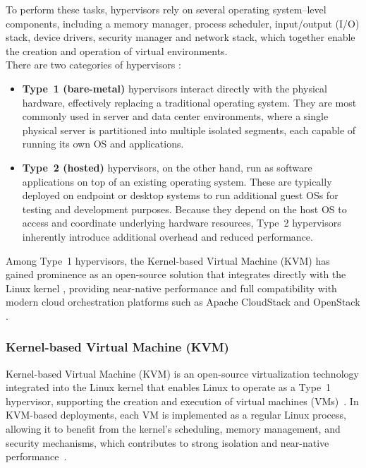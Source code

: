 \documentclass[sigplan]{acmart}
\begin{document}
            To perform these tasks, hypervisors rely on several operating system–level components, including a memory manager, process scheduler, input/output (I/O) stack, device drivers, security manager and network stack, which together enable the creation and operation of virtual environments.\\
            
            There are two categories of hypervisors \cite{IBMVirtualization}:
            \begin{itemize}
                \item \textbf{Type~1 (bare-metal)} hypervisors interact directly with the physical hardware, effectively replacing a traditional operating system. 
            They are most commonly used in server and data center environments, where a single physical server is partitioned into multiple isolated segments, each capable of running its own OS and applications.
            
                \item \textbf{Type~2 (hosted)} hypervisors, on the other hand, run as software applications on top of an existing operating system. 
            These are typically deployed on endpoint or desktop systems to run additional guest OSs for testing and development purposes. 
            Because they depend on the host OS to access and coordinate underlying hardware resources, Type~2 hypervisors inherently introduce additional overhead and reduced performance.
            \end{itemize}
    
            Among Type~1 hypervisors, the Kernel-based Virtual Machine (KVM) has gained prominence as an open-source solution that integrates directly with the Linux kernel \cite{kivityKvmLinuxVirtual}, providing near-native performance \cite{algarniPerformanceEvaluationXen2018} and full compatibility with modern cloud orchestration platforms such as Apache CloudStack and OpenStack \cite{vijayakumarPrivateCloudInfrastructure2025}.

        \subsubsection{Kernel-based Virtual Machine (KVM)} \label{sec:background.virtualization.kvm}
            Kernel-based Virtual Machine (KVM) is an open-source virtualization technology integrated into the Linux kernel that enables Linux to operate as a Type~1 hypervisor, supporting the creation and execution of virtual machines (VMs)~\cite{kivityKvmLinuxVirtual2007, RedhatKVM}. In KVM-based deployments, each VM is implemented as a regular Linux process, allowing it to benefit from the kernel’s scheduling, memory management, and security mechanisms, which contributes to strong isolation and near-native performance~\cite{kivityKvmLinuxVirtual2007}.\\
            
\end{document}
